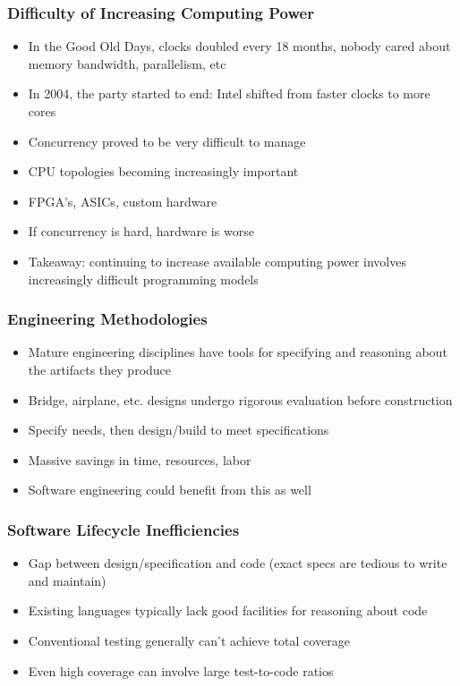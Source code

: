 \documentclass{beamer}
\begin{document}
\begin{frame}
  \frametitle{Difficulty of Increasing Computing Power}
  \begin{itemize}
    \item In the Good Old Days, clocks doubled every 18 months, nobody
      cared about memory bandwidth, parallelism, etc
    \item In 2004, the party started to end: Intel shifted from faster
      clocks to more cores
    \item Concurrency proved to be very difficult to manage
    \item CPU topologies becoming increasingly important
    \item FPGA's, ASICs, custom hardware
    \item If concurrency is hard, hardware is worse
    \item Takeaway: continuing to increase available computing power
      involves increasingly difficult programming models
  \end{itemize}
\end{frame}

\begin{frame}
  \frametitle{Engineering Methodologies}
  \begin{itemize}
    \item Mature engineering disciplines have tools for specifying and
      reasoning about the artifacts they produce
    \item Bridge, airplane, etc. designs undergo rigorous evaluation
      before construction
    \item Specify needs, then design/build to meet specifications
    \item Massive savings in time, resources, labor
    \item Software engineering could benefit from this as well
  \end{itemize}
\end{frame}

\begin{frame}
  \frametitle{Software Lifecycle Inefficiencies}
  \begin{itemize}
    \item Gap between design/specification and code (exact specs are
      tedious to write and maintain)
    \item Existing languages typically lack good facilities for
      reasoning about code
    \item Conventional testing generally can't achieve total coverage
    \item Even high coverage can involve large test-to-code ratios
  \end{itemize}
\end{frame}
\end{document}
